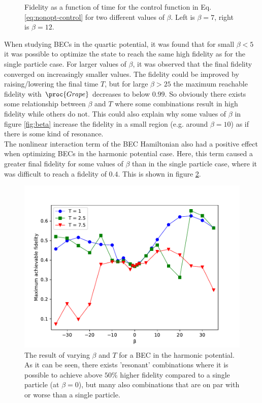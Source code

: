 \documentclass[aps,pra,reprint,superscriptaddress]{revtex4-1}
\begin{document}
\begin{figure}
\begin{subfigure}{0.45\columnwidth}
	\end{subfigure}
	\caption{Fidelity as a function of time for the control function in Eq. \eqref{eq:nonopt-control} for two different values of $\beta$. Left is $\beta=7$, right is $\beta=12$.}
	\label{fig:fidelityplot}
\end{figure}

When studying BECs in the quartic potential, it was found that for small $\beta<5$ it was possible to optimize the state to reach the same high fidelity as for the single particle case. For larger values of $\beta$, it was observed that the final fidelity converged on increasingly smaller values. The fidelity could be improved by raising/lowering the final time $T$, but for large $\beta > 25$ the maximum reachable fidelity with $\proc{Grape}$ decreases to below $0.99$. So obviously there exists some relationship between $\beta$ and $T$ where some combinations result in high fidelity while others do not. This could also explain why some values of $\beta$ in figure \ref{fig:beta} increase the fidelity in a small region (e.g. around $\beta=10$) as if there is some kind of resonance. \\

The nonlinear interaction term of the BEC Hamiltonian also had a positive effect when optimizing BECs in the harmonic potential case. Here, this term caused a greater final fidelity for some values of $\beta$ than in the single particle case, where it was difficult to reach a fidelity of $0.4$. This is shown in figure \ref{fig:HO}.\\
\begin{figure}[h]
	\includegraphics[width=\columnwidth]{graphics/betaTHO.pdf}
	\caption{The result of varying $\beta$ and $T$ for a BEC in the harmonic potential. As it can be seen, there exists 'resonant' combinations where it is possible to achieve above $50\%$ higher fidelity compared to a single particle (at $\beta=0$), but many also combinations that are on par with or worse than a single particle.}
	\label{fig:HO}
\end{figure}
\end{document}
